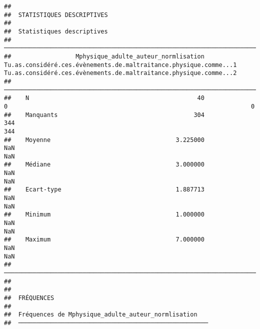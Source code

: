 \documentclass[
]{article}
\begin{document}
\begin{verbatim}
## 
##  STATISTIQUES DESCRIPTIVES
## 
##  Statistiques descriptives                                                                                                                                                                        
##  ──────────────────────────────────────────────────────────────────────────────────────────────────────────────────────────────────────────────────────────────────────────────────────────────── 
##                  Mphysique_adulte_auteur_normlisation    Tu.as.considéré.ces.évènements.de.maltraitance.physique.comme...1    Tu.as.considéré.ces.évènements.de.maltraitance.physique.comme...2   
##  ──────────────────────────────────────────────────────────────────────────────────────────────────────────────────────────────────────────────────────────────────────────────────────────────── 
##    N                                               40                                                                    0                                                                    0   
##    Manquants                                      304                                                                  344                                                                  344   
##    Moyenne                                   3.225000                                                                  NaN                                                                  NaN   
##    Médiane                                   3.000000                                                                  NaN                                                                  NaN   
##    Ecart-type                                1.887713                                                                  NaN                                                                  NaN   
##    Minimum                                   1.000000                                                                  NaN                                                                  NaN   
##    Maximum                                   7.000000                                                                  NaN                                                                  NaN   
##  ──────────────────────────────────────────────────────────────────────────────────────────────────────────────────────────────────────────────────────────────────────────────────────────────── 
## 
## 
##  FRÉQUENCES
## 
##  Fréquences de Mphysique_adulte_auteur_normlisation    
##  ───────────────────────────────────────────────────── 

\end{verbatim}
\end{document}
